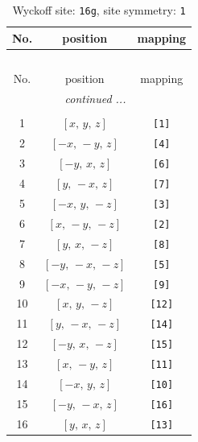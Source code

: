 \documentclass[fleqn,8pt]{jsarticle}
\begin{document}
\renewcommand{\arraystretch}{1.2}
\begin{longtable}{ccc}
\caption{Wyckoff site: {\tt 16g}, site symmetry: {\tt 1}}
 \\
 \hline \hline
No. & position & mapping \\ \hline \endfirsthead

\multicolumn{2}{l}{\tablename\ \thetable{}} \\
 \hline \hline
No. & position & mapping \\ \hline \endhead

 \hline \hline
\multicolumn{2}{r}{\footnotesize\it continued ...} \\ \endfoot

 \hline \hline
\multicolumn{2}{r}{} \\ \endlastfoot

1 & $\left[ x,\, y,\, z \right]$ & {\tt [1]} \\ \hline
2 & $\left[ - x,\, - y,\, z \right]$ & {\tt [4]} \\ \hline
3 & $\left[ - y,\, x,\, z \right]$ & {\tt [6]} \\ \hline
4 & $\left[ y,\, - x,\, z \right]$ & {\tt [7]} \\ \hline
5 & $\left[ - x,\, y,\, - z \right]$ & {\tt [3]} \\ \hline
6 & $\left[ x,\, - y,\, - z \right]$ & {\tt [2]} \\ \hline
7 & $\left[ y,\, x,\, - z \right]$ & {\tt [8]} \\ \hline
8 & $\left[ - y,\, - x,\, - z \right]$ & {\tt [5]} \\ \hline
9 & $\left[ - x,\, - y,\, - z \right]$ & {\tt [9]} \\ \hline
10 & $\left[ x,\, y,\, - z \right]$ & {\tt [12]} \\ \hline
11 & $\left[ y,\, - x,\, - z \right]$ & {\tt [14]} \\ \hline
12 & $\left[ - y,\, x,\, - z \right]$ & {\tt [15]} \\ \hline
13 & $\left[ x,\, - y,\, z \right]$ & {\tt [11]} \\ \hline
14 & $\left[ - x,\, y,\, z \right]$ & {\tt [10]} \\ \hline
15 & $\left[ - y,\, - x,\, z \right]$ & {\tt [16]} \\ \hline
16 & $\left[ y,\, x,\, z \right]$ & {\tt [13]} \\
\end{longtable}
\end{document}
